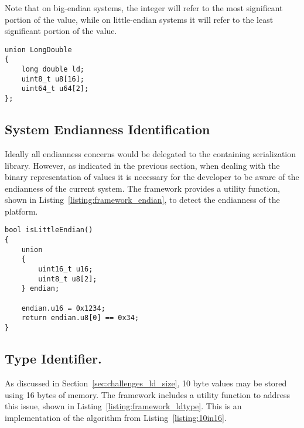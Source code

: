 Note that on big-endian systems, the integer  will refer to the most significant portion of the  value, while on little-endian systems it will refer to the least significant portion of the value.

\noindent
\begin{minipage}{\linewidth}
\begin{singlespace}
\begin{lstlisting}[caption=The \code{LongDouble} type., label=listing:framework_longdouble]
union LongDouble
{
    long double ld;
    uint8_t u8[16];
    uint64_t u64[2];
};
\end{lstlisting}
\end{singlespace}
\end{minipage}

\subsection{System Endianness Identification}
Ideally all endianness concerns would be delegated to the containing serialization library. However, as indicated in the previous section, when dealing with the binary representation of  values it is necessary for the developer to be aware of the endianness of the current system. The framework provides a utility function, shown in Listing~\ref{listing:framework_endian}, to detect the endianness of the platform.

\noindent
\begin{minipage}{\linewidth}
\begin{singlespace}
\begin{lstlisting}[caption=The endianness identifier utility function., label=listing:framework_endian]
bool isLittleEndian()
{
    union
    {
        uint16_t u16;
        uint8_t u8[2];
    } endian;

    endian.u16 = 0x1234;
    return endian.u8[0] == 0x34;
}
\end{lstlisting}
\end{singlespace}
\end{minipage}

\subsection{ Type Identifier.}
As discussed in Section~\ref{sec:challenges_ld_size}, 10 byte  values may be stored using 16 bytes of memory. The framework includes a utility function to address this issue, shown in Listing~\ref{listing:framework_ldtype}. This is an implementation of the algorithm from Listing~\ref{listing:10in16}.

